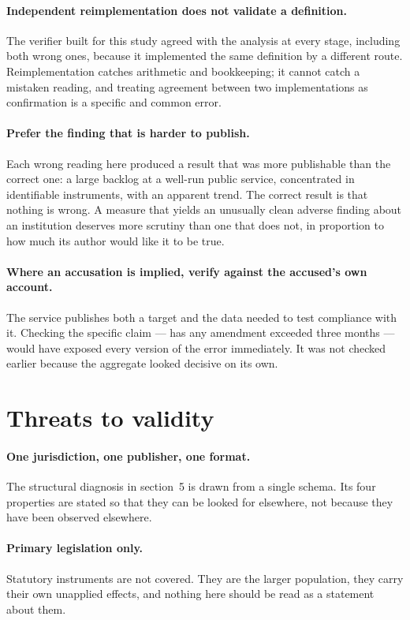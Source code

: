 \documentclass[11pt]{article}
\begin{document}
\paragraph{Independent reimplementation does not validate a definition.} The
verifier built for this study agreed with the analysis at every stage,
including both wrong ones, because it implemented the same definition by a
different route. Reimplementation catches arithmetic and bookkeeping; it cannot
catch a mistaken reading, and treating agreement between two implementations as
confirmation is a specific and common error.

\paragraph{Prefer the finding that is harder to publish.} Each wrong reading
here produced a result that was more publishable than the correct one: a large
backlog at a well-run public service, concentrated in identifiable instruments,
with an apparent trend. The correct result is that nothing is wrong. A measure
that yields an unusually clean adverse finding about an institution deserves
more scrutiny than one that does not, in proportion to how much its author
would like it to be true.

\paragraph{Where an accusation is implied, verify against the accused's own
account.} The service publishes both a target and the data needed to test
compliance with it. Checking the specific claim --- has any amendment exceeded
three months --- would have exposed every version of the error immediately. It
was not checked earlier because the aggregate looked decisive on its own.

\section{Threats to validity}

\paragraph{One jurisdiction, one publisher, one format.} The structural
diagnosis in section~5 is drawn from a single schema. Its four properties are
stated so that they can be looked for elsewhere, not because they have been
observed elsewhere.

\paragraph{Primary legislation only.} Statutory instruments are not covered.
They are the larger population, they carry their own unapplied effects, and
nothing here should be read as a statement about them.
\end{document}
